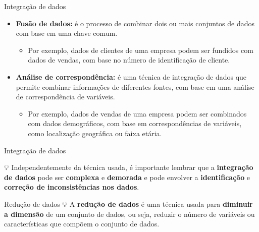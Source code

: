 \documentclass[
  ignorenonframetext,
  aspectratio=169,
]{beamer}
\providecommand{\tightlist}{%
  \setlength{\itemsep}{0pt}\setlength{\parskip}{0pt}}
\begin{document}
\begin{frame}{Integração de dados}
\label{integrauxe7uxe3o-de-dados-1}
\begin{itemize}
\item
  \textbf{Fusão de dados:} é o processo de combinar dois ou mais
  conjuntos de dados com base em uma chave comum.

  \begin{itemize}
  \tightlist
  \item
    Por exemplo, dados de clientes de uma empresa podem ser fundidos com
    dados de vendas, com base no número de identificação de cliente.
  \end{itemize}
\end{itemize}

\pause

\begin{itemize}
\item
  \textbf{Análise de correspondência:} é uma técnica de integração de
  dados que permite combinar informações de diferentes fontes, com base
  em uma análise de correspondência de variáveis.

  \begin{itemize}
  \tightlist
  \item
    Por exemplo, dados de vendas de uma empresa podem ser combinados com
    dados demográficos, com base em correspondências de variáveis, como
    localização geográfica ou faixa etária.
  \end{itemize}
\end{itemize}
\end{frame}

\begin{frame}{Integração de dados}
\label{integrauxe7uxe3o-de-dados-2}

{💡} Independentemente da técnica usada, é importante lembrar que a
\textbf{integração de dados} pode ser \textbf{complexa} e
\textbf{demorada} e pode envolver a \textbf{identificação} e
\textbf{correção de inconsistências nos dados}.
\end{frame}

\begin{frame}{Redução de dados}
\label{reduuxe7uxe3o-de-dados}
{💡} A \textbf{redução de dados} é uma técnica usada para
\textbf{diminuir a dimensão} de um conjunto de dados, ou seja, reduzir o
número de variáveis ou características que compõem o conjunto de dados.
\end{frame}
\end{document}

